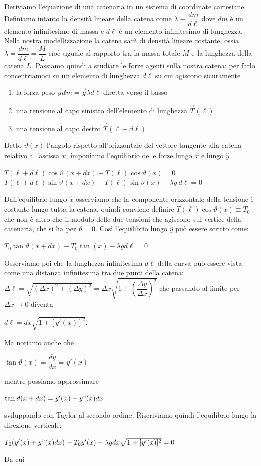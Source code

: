 \documentclass[a4paper,12pt]{article}
\begin{document}
Deriviamo l'equazione di una catenaria in un sistema di coordinate cartesiane. Definiamo intanto la densità lineare della catena come $\lambda\equiv\dfrac{dm}{d\ell}$ dove $dm$ è un elemento infinitesimo di massa e $d\ell$ è un elemento infinitesimo di lunghezza. Nella nostra modellizzazione la catena sarà di densità lineare costante, ossia $\lambda=\dfrac{dm}{d\ell}=\dfrac{M}{L}$ cioè uguale al rapporto tra la massa totale $M$ e la lunghezza della catena $L$. Passiamo quindi a studiare le forze agenti sulla nostra catena: per farlo concentriamoci su un elemento di lunghezza $d\ell$ su cui agiscono sicuramente
\begin{enumerate}
    \item la forza peso $\vec gdm=\vec g\lambda d\ell$ diretta verso il basso
    \item una tensione al capo sinistro dell'elemento di lunghezza $\vec T(\ell)$
    \item una tensione al capo destro $\vec T(\ell+d\ell)$
\end{enumerate}
Detto $\vartheta(x)$ l'angolo rispetto all'orizzontale del vettore tangente alla catena relativo all'ascissa $x$, imponiamo l'equilibrio delle forze lungo $\hat x$ e lungo $\hat y$.
\begin{center}
    $T(\ell +d\ell)\cos\vartheta(x+dx)-T(\ell)\cos\vartheta(x)=0$\\
    $T(\ell+d\ell)\sin\vartheta(x+dx)-T(\ell)\sin\vartheta(x)-\lambda g\
    d\ell=0$
    
\end{center}
Dall'equilibrio lungo $\hat x$ osserviamo che la componente orizzontale della tensione è costante lungo tutta la catena, quindi conviene definire $T(\ell)\cos\vartheta(x)\equiv T_0$ che non è altro che il modulo delle due tensioni che agiscono sul vertice della catenaria, che si ha per $\vartheta=0$. Così l'equilibrio lungo $\hat y$ può essere scritto come:
\begin{center}
    $T_0 \tan \vartheta(x+dx)-T_0\tan(x)-\lambda g d\ell=0$
\end{center}
Osserviamo poi che la lunghezza infinitesima $d\ell$ della curva può essere vista come una distanza infinitesima tra due punti della catena: $\Delta \ell=\sqrt{(\Delta x)^2+(\Delta y)^2 }=\Delta x\sqrt{1+\left(\dfrac{\Delta y}{\Delta x}\right)^2}$ che passando al limite per $\Delta x \rightarrow 0 $ diventa 
\begin{center}
    $d\ell=dx\sqrt{1+[y'(x)]^2}$.
\end{center} Ma notiamo anche che
\begin{center}
    $\tan \vartheta (x)=\dfrac{dy}{dx}=y'(x)$
\end{center} mentre possiamo approssimare \begin{center}
    $\tan \vartheta(x+dx)=y'(x)+y"(x)dx$
\end{center} sviluppando con Taylor al secondo ordine.
Riscriviamo quindi l'equilibrio lungo la direzione verticale:\\
\begin{center}
    $T_0(y'(x)+y"(x)dx)-T_0y'(x)-\lambda g dx\sqrt{1+[y'(x)]^2}=0$\\
\end{center}
    Da cui\\
\end{document}
